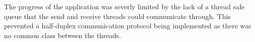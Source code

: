 \documentclass[10pt]{article}
\begin{document}
\begin{multicols*}{2}
The progress of the application was severly limited by the lack of a thread safe queue that the send and receive threads could communicate through. This prevented a half-duplex communication protocol being implemented as there was no common class between the threads.


\nocite{*} %



\end{multicols*}
\end{document}
